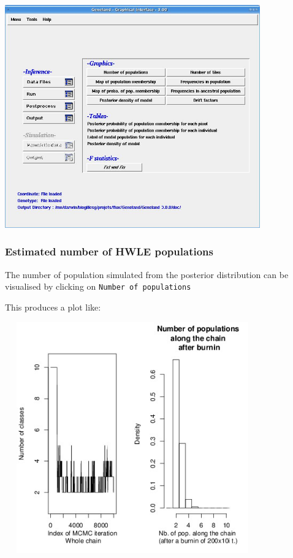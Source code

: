 \documentclass{article}
\begin{document}
\centerline{\includegraphics[width=11cm]{../inst/images/output.jpg}}

\bigskip

\clearpage
\subsubsection{Estimated number  of HWLE populations}
The number of population simulated from the posterior distribution can be visualised by clicking on \texttt{Number of populations}


This produces a plot like:\\

\centerline{\includegraphics[height=10cm,width=11cm]{../inst/images/npop.jpeg}}
\end{document}

